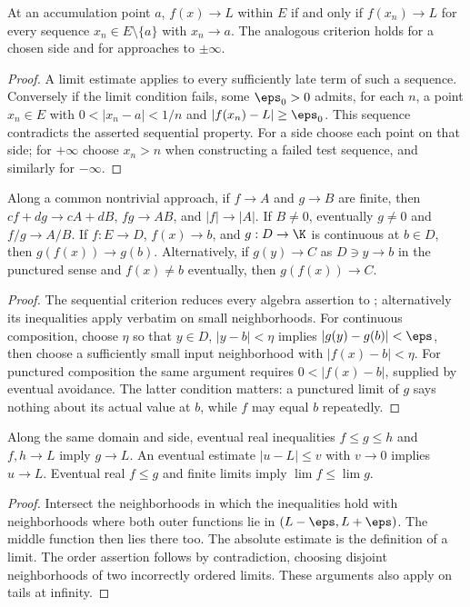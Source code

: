 \begin{theorem}
At an accumulation point $a$, $f(x)\to L$ within $E$ if and only if $f(x_n)\to L$ for every sequence $x_n\in E\setminus\{a\}$ with $x_n\to a$. The analogous criterion holds for a chosen side and for approaches to $\pm\infty$.
\end{theorem}
\begin{proof}
A limit estimate applies to every sufficiently late term of such a sequence. Conversely if the limit condition fails, some $\eps_0>0$ admits, for each $n$, a point $x_n\in E$ with $0<|x_n-a|<1/n$ and $|f(x_n)-L|\ge\eps_0$. This sequence contradicts the asserted sequential property. For a side choose each point on that side; for $+\infty$ choose $x_n>n$ when constructing a failed test sequence, and similarly for $-\infty$.
\end{proof}

\begin{theorem}
Along a common nontrivial approach, if $f\to A$ and $g\to B$ are finite, then $cf+dg\to cA+dB$, $fg\to AB$, and $|f|\to|A|$. If $B\ne0$, eventually $g\ne0$ and $f/g\to A/B$.
If $f:E\to D$, $f(x)\to b$, and $g:D\to\K$ is continuous at $b\in D$, then $g(f(x))\to g(b)$. Alternatively, if $g(y)\to C$ as $D\ni y\to b$ in the punctured sense and $f(x)\ne b$ eventually, then $g(f(x))\to C$.
\end{theorem}
\begin{proof}
The sequential criterion reduces every algebra assertion to ; alternatively its inequalities apply verbatim on small neighborhoods. For continuous composition, choose $\eta$ so that $y\in D$, $|y-b|<\eta$ implies $|g(y)-g(b)|<\eps$, then choose a sufficiently small input neighborhood with $|f(x)-b|<\eta$. For punctured composition the same argument requires $0<|f(x)-b|$, supplied by eventual avoidance. The latter condition matters: a punctured limit of $g$ says nothing about its actual value at $b$, while $f$ may equal $b$ repeatedly.
\end{proof}

\begin{theorem}
Along the same domain and side, eventual real inequalities $f\le g\le h$ and $f,h\to L$ imply $g\to L$. An eventual estimate $|u-L|\le v$ with $v\to0$ implies $u\to L$. Eventual real $f\le g$ and finite limits imply $\lim f\le\lim g$.
\end{theorem}
\begin{proof}
Intersect the neighborhoods in which the inequalities hold with neighborhoods where both outer functions lie in $(L-\eps,L+\eps)$. The middle function then lies there too. The absolute estimate is the definition of a limit. The order assertion follows by contradiction, choosing disjoint neighborhoods of two incorrectly ordered limits. These arguments also apply on tails at infinity.
\end{proof}

